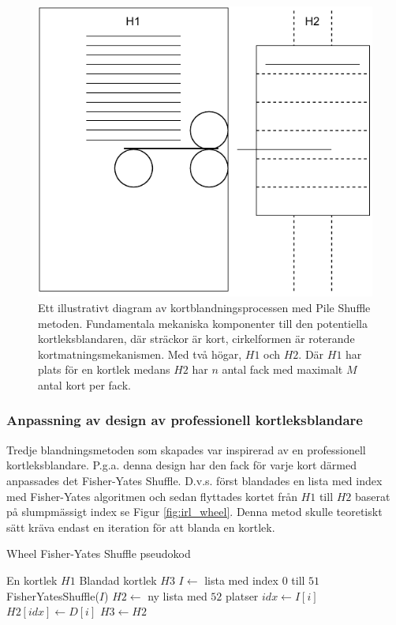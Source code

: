 \documentclass[swedish,a4paper]{article}
\begin{document}
\begin{figure}[H]
	\centering
	\includegraphics[width=0.4\linewidth]{irl_pile_shuffle.pdf}
	\captionsetup{width=0.5\textwidth} \caption{Ett illustrativt diagram av
		kortblandningsprocessen med 
	Pile Shuffle metoden. Fundamentala mekaniska komponenter till den potentiella
	kortleksblandaren, där sträckor är kort, cirkelformen är roterande
kortmatningsmekanismen. Med två högar, $H1$ och $H2$. Där $H1$ har plats för en
kortlek medans $H2$ har $n$ antal fack med maximalt $M$ antal kort per fack.}
	\label{fig:irl_pile}
	
\end{figure}

\subsubsection{Anpassning av design av professionell kortleksblandare}
Tredje blandningsmetoden som skapades var inspirerad av en professionell
kortleksblandare. P.g.a. denna design har den fack för varje kort därmed anpassades det
Fisher-Yates Shuffle.
D.v.s. först blandades en lista med index med
Fisher-Yates algoritmen och sedan flyttades kortet från $H1$ till $H2$ baserat på
slumpmässigt index se Figur \ref{fig:irl_wheel}. Denna metod skulle teoretiskt sätt kräva endast en iteration för att blanda en kortlek.

\begin{algorithm}
\caption{Wheel Fisher-Yates Shuffle pseudokod}
\label{alg:wheel}
\begin{algorithmic}[1]
\Require En kortlek $H1$
\Ensure Blandad kortlek $H3$ 
\State $I \gets$ lista med index $0$ till $51$ 
\State FisherYatesShuffle($I$) 
\State $H2 \gets$ ny lista med $52$ platser 
    \State $idx \gets I[i]$ 
    \State $H2[idx] \gets D[i]$ 
\EndFor
\State $H3 \gets H2$ 
\end{algorithmic}
\end{algorithm}
\end{document}
